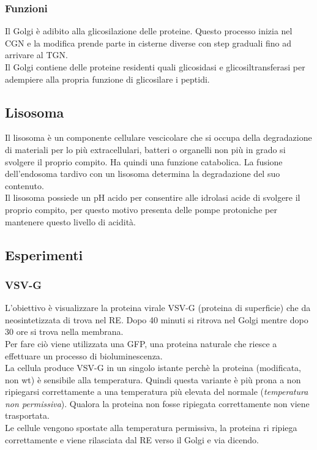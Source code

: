             \subsubsection{Funzioni}
            Il Golgi è adibito alla glicosilazione delle proteine. Questo processo inizia nel CGN e la modifica prende parte in cisterne diverse con step graduali fino ad arrivare al TGN. \\
            Il Golgi contiene delle proteine residenti quali glicosidasi e glicosiltransferasi per adempiere alla propria funzione di glicosilare i peptidi.
            
    \subsection{Lisosoma}
        Il lisosoma è un componente cellulare vescicolare che si occupa della degradazione di materiali per lo più extracellulari, batteri o organelli non più in grado si svolgere il proprio compito. Ha quindi una funzione catabolica. La fusione dell'endosoma tardivo con un lisosoma determina la degradazione del suo contenuto.\\
        Il lisosoma possiede un pH acido per consentire alle idrolasi acide di svolgere il proprio compito, per questo motivo presenta delle pompe protoniche per mantenere questo livello di acidità. 
            
    \subsection{Esperimenti}
        \subsubsection{VSV-G}
            L'obiettivo è visualizzare la proteina virale VSV-G (proteina di superficie) che da neosintetizzata di trova nel RE. Dopo 40 minuti si ritrova nel Golgi mentre dopo 30 ore si trova nella membrana.\\ 
            Per fare ciò viene utilizzata una GFP, una proteina naturale che riesce a effettuare un processo di bioluminescenza.\\
            La cellula produce VSV-G in un singolo istante perchè la proteina (modificata, non wt) è sensibile alla temperatura. Quindi questa variante è più prona a non ripiegarsi correttamente a una temperatura più elevata del normale (\textit{temperatura non permissiva}). 
            Qualora la proteina non fosse ripiegata correttamente non viene trasportata.\\
            Le cellule vengono spostate alla temperatura permissiva, la proteina ri ripiega correttamente e viene rilasciata dal RE verso il Golgi e via dicendo.
            
